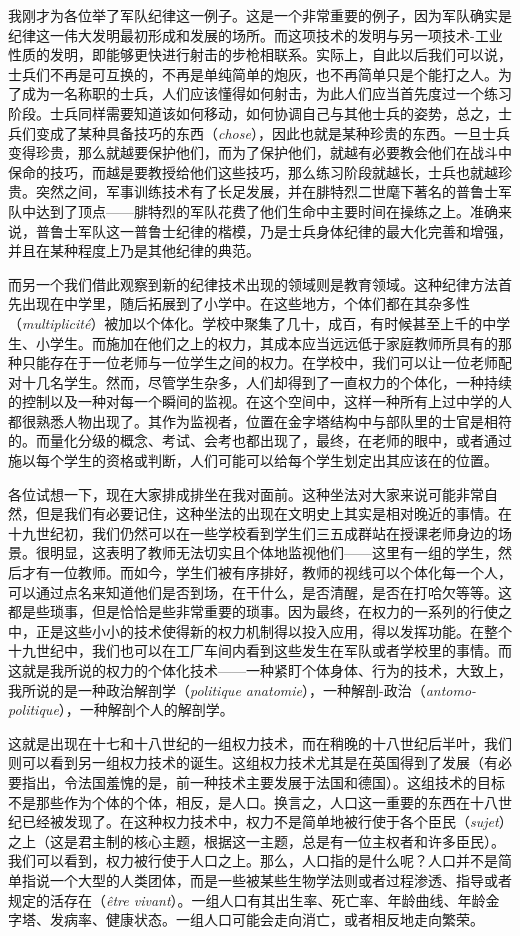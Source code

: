 \documentclass[fontset=fandol, a4paper, 12pt, twoside]{ctexart}
\newcommand{\fr}[1]{\textit{#1}}
\begin{document}
我刚才为各位举了军队纪律这一例子。这是一个非常重要的例子，因为军队确实是纪律这一伟大发明最初形成和发展的场所。而这项技术的发明与另一项技术-工业性质的发明，即能够更快进行射击的步枪相联系。实际上，自此以后我们可以说，士兵们不再是可互换的，不再是单纯简单的炮灰，也不再简单只是个能打之人。为了成为一名称职的士兵，人们应该懂得如何射击，为此人们应当首先度过一个练习阶段。士兵同样需要知道该如何移动，如何协调自己与其他士兵的姿势，总之，士兵们变成了某种具备技巧的东西（\fr{chose}），因此也就是某种珍贵的东西。一旦士兵变得珍贵，那么就越要保护他们，而为了保护他们，就越有必要教会他们在战斗中保命的技巧，而越是要教授给他们这些技巧，那么练习阶段就越长，士兵也就越珍贵。突然之间，军事训练技术有了长足发展，并在腓特烈二世麾下著名的普鲁士军队中达到了顶点——腓特烈的军队花费了他们生命中主要时间在操练之上。准确来说，普鲁士军队这一普鲁士纪律的楷模，乃是士兵身体纪律的最大化完善和增强，并且在某种程度上乃是其他纪律的典范。

而另一个我们借此观察到新的纪律技术出现的领域则是教育领域。这种纪律方法首先出现在中学里，随后拓展到了小学中。在这些地方，个体们都在其杂多性（\fr{multiplicité}）被加以个体化。学校中聚集了几十，成百，有时候甚至上千的中学生、小学生。而施加在他们之上的权力，其成本应当远远低于家庭教师所具有的那种只能存在于一位老师与一位学生之间的权力。在学校中，我们可以让一位老师配对十几名学生。然而，尽管学生杂多，人们却得到了一直权力的个体化，一种持续的控制以及一种对每一个瞬间的监视。在这个空间中，这样一种所有上过中学的人都很熟悉人物出现了。其作为监视者，位置在金字塔结构中与部队里的士官是相符的。而量化分级的概念、考试、会考也都出现了，最终，在老师的眼中，或者通过施以每个学生的资格或判断，人们可能可以给每个学生划定出其应该在的位置。


各位试想一下，现在大家排成排坐在我对面前。这种坐法对大家来说可能非常自然，但是我们有必要记住，这种坐法的出现在文明史上其实是相对晚近的事情。在十九世纪初，我们仍然可以在一些学校看到学生们三五成群站在授课老师身边的场景。很明显，这表明了教师无法切实且个体地监视他们——这里有一组的学生，然后才有一位教师。而如今，学生们被有序排好，教师的视线可以个体化每一个人，可以通过点名来知道他们是否到场，在干什么，是否清醒，是否在打哈欠等等。这都是些琐事，但是恰恰是些非常重要的琐事。因为最终，在权力的一系列的行使之中，正是这些小小的技术使得新的权力机制得以投入应用，得以发挥功能。在整个十九世纪中，我们也可以在工厂车间内看到这些发生在军队或者学校里的事情。而这就是我所说的权力的个体化技术——一种紧盯个体身体、行为的技术，大致上，我所说的是一种政治解剖学（\fr{politique anatomie}），一种解剖-政治（\fr{antomo-politique}），一种解剖个人的解剖学。

这就是出现在十七和十八世纪的一组权力技术，而在稍晚的十八世纪后半叶，我们则可以看到另一组权力技术的诞生。这组权力技术尤其是在英国得到了发展（有必要指出，令法国羞愧的是，前一种技术主要发展于法国和德国）。这组技术的目标不是那些作为个体的个体，相反，是人口。换言之，人口这一重要的东西在十八世纪已经被发现了。在这种权力技术中，权力不是简单地被行使于各个臣民（\fr{sujet}）之上（这是君主制的核心主题，根据这一主题，总是有一位主权者和许多臣民）。我们可以看到，权力被行使于人口之上。那么，人口指的是什么呢？人口并不是简单指说一个大型的人类团体，而是一些被某些生物学法则或者过程渗透、指导或者规定的活存在（\fr{être vivant}）。一组人口有其出生率、死亡率、年龄曲线、年龄金字塔、发病率、健康状态。一组人口可能会走向消亡，或者相反地走向繁荣。
\end{document}
